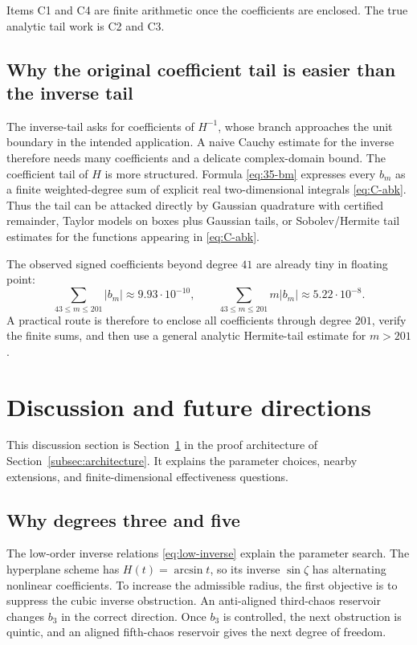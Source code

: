 \documentclass[11pt]{article}
\newcommand{\1}{\mathbf 1}
\theoremstyle{plain}
\theoremstyle{definition}
\theoremstyle{remark}
\begin{document}
Items C1 and C4 are finite arithmetic once the coefficients are enclosed.  The true analytic tail work is C2 and C3.

\subsection{Why the original coefficient tail is easier than the inverse tail}

The inverse-tail asks for coefficients of \(H^{-1}\), whose branch approaches the unit boundary in the intended application.  A naive Cauchy estimate for the inverse therefore needs many coefficients and a delicate complex-domain bound.  The coefficient tail of \(H\) is more structured.  Formula \eqref{eq:35-bm} expresses every \(b_m\) as a finite weighted-degree sum of explicit real two-dimensional integrals \eqref{eq:C-abk}.  Thus the tail can be attacked directly by Gaussian quadrature with certified remainder, Taylor models on boxes plus Gaussian tails, or Sobolev/Hermite tail estimates for the functions appearing in \eqref{eq:C-abk}.

The observed signed coefficients beyond degree \(41\) are already tiny in floating point:
\[
  \sum_{43\le m\le201}|b_m|\approx 9.93\cdot10^{-10},
  \qquad
  \sum_{43\le m\le201}m|b_m|\approx 5.22\cdot10^{-8}.
\]
A practical route is therefore to enclose all coefficients through degree \(201\), verify the finite sums, and then use a general analytic Hermite-tail estimate for \(m>201\).

\section{Discussion and future directions}\label{sec:discussion}

This discussion section is Section~\ref{sec:discussion} in the proof architecture of Section~\ref{subsec:architecture}.  It explains the parameter choices, nearby extensions, and finite-dimensional effectiveness questions.

\subsection{Why degrees three and five}

The low-order inverse relations \eqref{eq:low-inverse} explain the parameter search.  The hyperplane scheme has \(H(t)=\arcsin t\), so its inverse \(\sin\zeta\) has alternating nonlinear coefficients.  To increase the admissible radius, the first objective is to suppress the cubic inverse obstruction.  An anti-aligned third-chaos reservoir changes \(b_3\) in the correct direction.  Once \(b_3\) is controlled, the next obstruction is quintic, and an aligned fifth-chaos reservoir gives the next degree of freedom.
\end{document}
